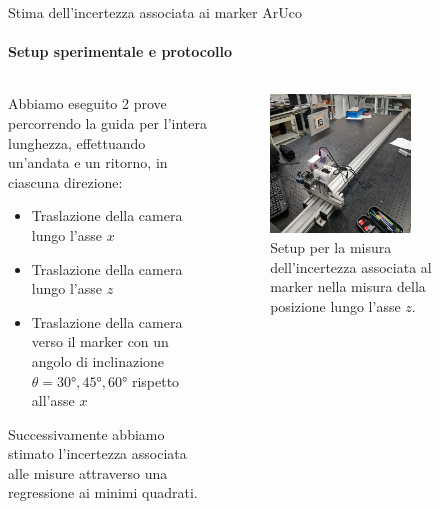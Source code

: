 \documentclass{beamer}
\begin{document}
\begin{frame}{Stima dell'incertezza associata ai marker ArUco}
\framesubtitle{Setup sperimentale e protocollo}
\begin{columns}
\begin{column}{0.6\textwidth}
Abbiamo eseguito 2 prove percorrendo la guida per l'intera lunghezza, effettuando un'andata e un ritorno, in ciascuna direzione:
    \begin{itemize}
        \item Traslazione della camera lungo l'asse $x$
        \item Traslazione della camera lungo l'asse $z$
        \item Traslazione della camera verso il marker con un angolo di inclinazione $\theta = 30°,45°,60°$ rispetto all'asse $x$
    \end{itemize}
Successivamente abbiamo stimato l'incertezza associata alle misure attraverso una regressione ai minimi quadrati.
\end{column}
\begin{column}{0.4\textwidth}
    \begin{figure}
        \centering
        \includegraphics[width=0.7\textwidth]{images/setupArUco.jpg}
        \caption{Setup per la misura dell'incertezza associata al marker nella misura della posizione lungo l'asse $z$.}
        \label{fig:setupArUco}
    \end{figure}
\end{column}
\end{columns}
\end{frame}
\end{document}
